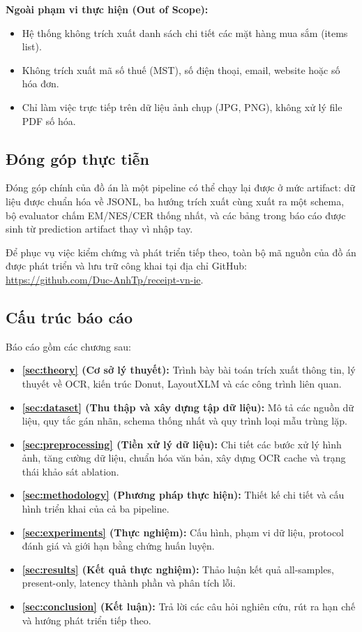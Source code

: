 \textbf{Ngoài phạm vi thực hiện (Out of Scope):}
\begin{itemize}
  \item Hệ thống không trích xuất danh sách chi tiết các mặt hàng mua sắm (items list).
  \item Không trích xuất mã số thuế (MST), số điện thoại, email, website hoặc số hóa đơn.
  \item Chỉ làm việc trực tiếp trên dữ liệu ảnh chụp (JPG, PNG), không xử lý file PDF số hóa.
\end{itemize}

\subsection{Đóng góp thực tiễn}
\label{subsec:contributions}

Đóng góp chính của đồ án là một pipeline có thể chạy lại được ở mức artifact: dữ liệu được chuẩn hóa về JSONL, ba hướng trích xuất cùng xuất ra một schema, bộ evaluator chấm EM/NES/CER thống nhất, và các bảng trong báo cáo được sinh từ prediction artifact thay vì nhập tay.

Để phục vụ việc kiểm chứng và phát triển tiếp theo, toàn bộ mã nguồn của đồ án được phát triển và lưu trữ công khai tại địa chỉ GitHub: \url{https://github.com/Duc-AnhTp/receipt-vn-ie}.

\subsection{Cấu trúc báo cáo}
\label{subsec:report-structure}

Báo cáo gồm các chương sau:
\begin{itemize}
  \item \textbf{\cref{sec:theory} (Cơ sở lý thuyết):} Trình bày bài toán trích xuất thông tin, lý thuyết về OCR, kiến trúc Donut, LayoutXLM và các công trình liên quan.
  \item \textbf{\cref{sec:dataset} (Thu thập và xây dựng tập dữ liệu):} Mô tả các nguồn dữ liệu, quy tắc gán nhãn, schema thống nhất và quy trình loại mẫu trùng lặp.
  \item \textbf{\cref{sec:preprocessing} (Tiền xử lý dữ liệu):} Chi tiết các bước xử lý hình ảnh, tăng cường dữ liệu, chuẩn hóa văn bản, xây dựng OCR cache và trạng thái khảo sát ablation.
  \item \textbf{\cref{sec:methodology} (Phương pháp thực hiện):} Thiết kế chi tiết và cấu hình triển khai của cả ba pipeline.
  \item \textbf{\cref{sec:experiments} (Thực nghiệm):} Cấu hình, phạm vi dữ liệu, protocol đánh giá và giới hạn bằng chứng huấn luyện.
  \item \textbf{\cref{sec:results} (Kết quả thực nghiệm):} Thảo luận kết quả all-samples, present-only, latency thành phần và phân tích lỗi.
  \item \textbf{\cref{sec:conclusion} (Kết luận):} Trả lời các câu hỏi nghiên cứu, rút ra hạn chế và hướng phát triển tiếp theo.
\end{itemize}
